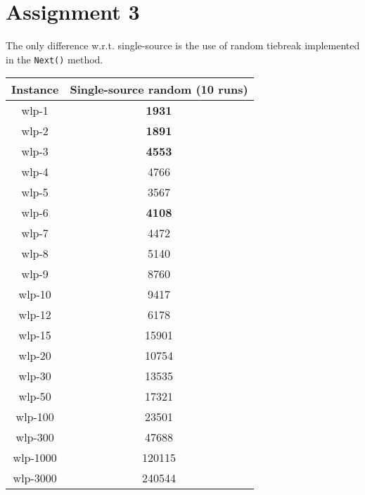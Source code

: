 \documentclass{article}
\newcommand{\sol}[1]{#1}
\newcommand{\opt}[1]{\textbf{#1}}
\begin{document}
\newpage

\section{Assignment 3}

The only difference w.r.t. single-source is the use of random tiebreak implemented in 
the \texttt{Next()} method.

\begin{table}[H]
    \begin{center}
        \begin{tabular}{|c|c|}
            \hline
            \textbf{Instance}&\textbf{Single-source random (10 runs)} \\
            \hline
            wlp-1         &   \opt{1931}    \\
            \hline
            wlp-2         &   \opt{1891}    \\
            \hline
            wlp-3         &   \opt{4553}    \\
            \hline
            wlp-4         &   \sol{4766}    \\
            \hline
            wlp-5         &   \sol{3567}    \\
            \hline
            wlp-6         &   \opt{4108}    \\
            \hline
            wlp-7         &   \sol{4472}    \\
            \hline
            wlp-8         &   \sol{5140}    \\
            \hline
            wlp-9         &   \sol{8760}    \\
            \hline
            wlp-10        &   \sol{9417}    \\
            \hline
            wlp-12        &   \sol{6178}    \\
            \hline
            wlp-15        &   \sol{15901}   \\
            \hline
            wlp-20        &   \sol{10754}   \\
            \hline
            wlp-30        &   \sol{13535}   \\
            \hline
            wlp-50        &   \sol{17321}   \\
            \hline
            wlp-100       &   \sol{23501}   \\
            \hline
            wlp-300       &   \sol{47688}   \\
            \hline
            wlp-1000      &   \sol{120115}  \\
            \hline
            wlp-3000      &   \sol{240544}  \\
            \hline
        \end{tabular}
    \end{center}
\end{table}
\end{document}
